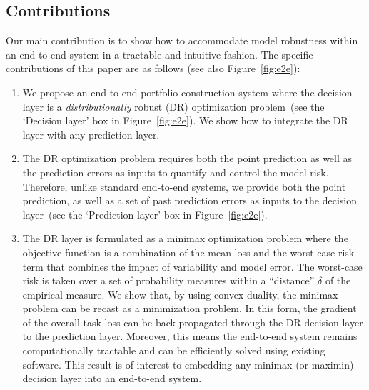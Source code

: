 \documentclass[10pt, twocolumn]{article}
\theoremstyle{plain}
\theoremstyle{definition}
\begin{document}
\subsection{Contributions}

Our main contribution is to show how to accommodate model robustness
within an end-to-end system in a tractable and intuitive fashion. The 
specific contributions of this paper are as follows (see also 
Figure~\ref{fig:e2e}):   

\begin{enumerate}[itemsep=-0.1em, topsep=0pt, leftmargin=*]
\item We propose an end-to-end portfolio construction system where 
    the decision layer is a \emph{distributionally} robust (DR) 
    optimization problem~(see the `Decision layer' box in 
    Figure~\ref{fig:e2e}). We show how to integrate the DR layer with 
    any prediction layer. 
  
\item The DR optimization problem requires both the point prediction 
    as well as the prediction errors as inputs to quantify and control 
    the model risk. Therefore, unlike standard end-to-end systems, we 
    provide both the point prediction, as well as a set of 
    past prediction errors as inputs to the decision layer~(see 
    the `Prediction layer' box in Figure~\ref{fig:e2e}). 
  
\item The DR layer is formulated as a minimax optimization problem where
    the objective function is a combination of the mean loss and the
    worst-case risk term that combines the impact of variability and model
    error. The worst-case risk is taken over a set of probability measures
    within a ``distance'' \(\delta\) of the empirical measure. We show that, 
    by using convex duality, the minimax problem can be recast as a minimization
    problem. In this form, the gradient of the overall task loss can be 
    back-propagated through the DR decision layer to the prediction layer.
    Moreover, this means the end-to-end system remains computationally tractable
    and can be efficiently solved using existing software. This result
    is of interest to embedding any minimax (or maximin) decision layer into an
    end-to-end system.
    

\end{enumerate}
\end{document}
